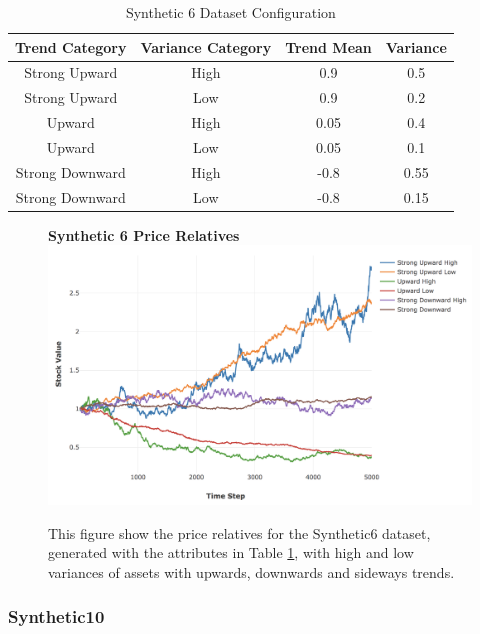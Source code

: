 \documentclass[a4paper,11pt,oneside]{article}
\theoremstyle{plain}
\theoremstyle{definition}
\begin{document}
	\begin{table}[h]
		\centering
		\small
		\begin{tabular}{|c|c|c|c|}
			\hline
			\textbf{Trend Category} &\textbf{Variance Category} & \textbf{Trend Mean} & \textbf{Variance}\\\hline	
			{Strong Upward} & {High} & {0.9} & {0.5} \\\hline
			{Strong Upward} & {Low} & {0.9} & {0.2} \\\hline
			{Upward} & {High} & {0.05} & {0.4} \\\hline
			{Upward} & {Low} & {0.05} & {0.1} \\\hline
			{Strong Downward} & {High} & {-0.8} & {0.55} \\\hline
			{Strong Downward} & {Low} & {-0.8} & {0.15} \\\hline
		\end{tabular}
		\newline\newline
		\caption{Synthetic 6 Dataset Configuration}\label{tab_synth6}
	\end{table}
	
	\begin{figure}[H]
		\centering
		\textbf{Synthetic 6 Price Relatives}
		\includegraphics[scale=0.35]{images/results/prices/synthetic6_prices.png} 
		\caption[Synthetic 6 Price Relatives]{This figure show the price relatives for the Synthetic6 dataset, generated with the attributes in Table \ref{tab_synth6}, with high and low variances of assets with upwards, downwards and sideways trends.}
		\label{figure-synthetic6_prices}
	\end{figure}
	
	\subsubsection{Synthetic10}\label{dataset_synthetic10}
	
\end{document}
